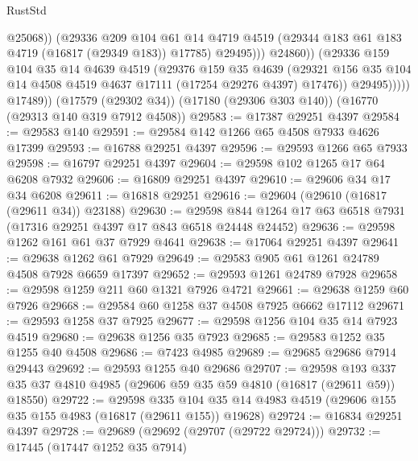 \begin{lexlean}{RustStd}
\begin{coremodule}
                            @25068))
                        (@29336
                          @209
                          @104
                          @61
                          @14
                          @4719
                          @4519
                          (@29344 @183 @61 @183 @4719 (@16817 (@29349 @183)) @17785)
                          @29495)))
                    @24860))
                (@29336
                  @159
                  @104
                  @35
                  @14
                  @4639
                  @4519
                  (@29376
                    @159
                    @35
                    @4639
                    (@29321
                      @156
                      @35
                      @104
                      @14
                      @4508
                      @4519
                      @4637
                      @17111
                      (@17254 @29276 @4397)
                      @17476))
                  @29495)))))
        @17489))
    (@17579 (@29302 @34))
    (@17180 (@29306 @303 @140))
    (@16770 (@29313 @140 @319 @7912 @4508))
@29583 := @17387 @29251 @4397
@29584 := @29583 @140
@29591 := @29584 @142 @1266 @65 @4508 @7933 @4626 @17399
@29593 := @16788 @29251 @4397
@29596 := @29593 @1266 @65 @7933
@29598 := @16797 @29251 @4397
@29604 := @29598 @102 @1265 @17 @64 @6208 @7932
@29606 := @16809 @29251 @4397
@29610 := @29606 @34 @17 @34 @6208
@29611 := @16818 @29251
@29616 := @29604 (@29610 (@16817 (@29611 @34)) @23188)
@29630 := @29598 @844 @1264 @17 @63 @6518 @7931 (@17316 @29251 @4397 @17 @843 @6518 @24448 @24452)
@29636 := @29598 @1262 @161 @61 @37 @7929 @4641
@29638 := @17064 @29251 @4397
@29641 := @29638 @1262 @61 @7929
@29649 := @29583 @905 @61 @1261 @24789 @4508 @7928 @6659 @17397
@29652 := @29593 @1261 @24789 @7928
@29658 := @29598 @1259 @211 @60 @1321 @7926 @4721
@29661 := @29638 @1259 @60 @7926
@29668 := @29584 @60 @1258 @37 @4508 @7925 @6662 @17112
@29671 := @29593 @1258 @37 @7925
@29677 := @29598 @1256 @104 @35 @14 @7923 @4519
@29680 := @29638 @1256 @35 @7923
@29685 := @29583 @1252 @35 @1255 @40 @4508
@29686 := @7423 @4985
@29689 := @29685 @29686 @7914 @29443
@29692 := @29593 @1255 @40 @29686
@29707 := @29598
    @193
    @337
    @35
    @37
    @4810
    @4985
    (@29606 @59 @35 @59 @4810 (@16817 (@29611 @59)) @18550)
@29722 := @29598
    @335
    @104
    @35
    @14
    @4983
    @4519
    (@29606 @155 @35 @155 @4983 (@16817 (@29611 @155)) @19628)
@29724 := @16834 @29251 @4397
@29728 := @29689 (@29692 (@29707 (@29722 @29724)))
@29732 := @17445 (@17447 @1252 @35 @7914)

\end{coremodule}
\end{lexlean}
